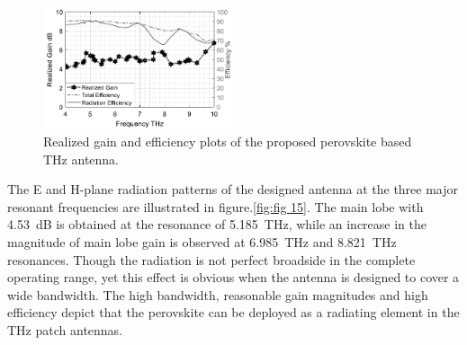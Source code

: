 \documentclass[12pt]{suhbook}
\begin{document}
\begin{figure}[hbt!]
\centering
\includegraphics[width=0.5\textwidth]{19}
\caption{Realized gain and efficiency plots of the proposed perovskite based THz antenna.}
\label{Fig 119}
\end{figure}
% 
The E and H-plane radiation patterns of the designed antenna at the three major resonant frequencies are illustrated in figure.\ref{fig:fig 15}. The main lobe with \SI{4.53 }{\dB} is obtained at the resonance of \SI{5.185}{\THz}, while an increase in the magnitude of main lobe gain is observed at \SI{6.985}{\THz} and \SI{8.821}{\THz} resonances. Though the radiation is not perfect broadside in the complete operating range, yet this effect is obvious when the antenna is designed to cover a wide bandwidth. The high bandwidth, reasonable gain magnitudes and high efficiency depict that the perovskite can be deployed as a radiating element in the THz patch antennas.
% 
\end{document}
